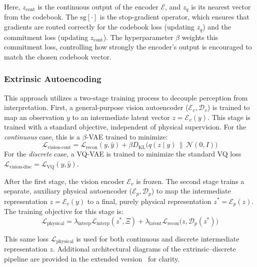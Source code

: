 \documentclass[nonacm,sigconf]{acmart}
\begin{document}
Here, \(z_{\text{cont}}\) is the continuous output of the encoder \(\mathcal{E}\), and \(z_q\) is its nearest vector from the codebook. The \(\text{sg}[\cdot]\) is the stop-gradient operator, which ensures that gradients are routed correctly for the codebook loss (updating \(z_q\)) and the commitment loss (updating \(z_{\text{cont}}\)). The hyperparameter \(\beta\) weights this commitment loss, controlling how strongly the encoder's output is encouraged to match the chosen codebook vector.


\subsubsection{Extrinsic Autoencoding}


This approach utilizes a two-stage training process to decouple perception from interpretation.
First, a general-purpose vision autoencoder (\(\mathcal{E}_v, \mathcal{D}_v\)) is trained to map an observation \(y\) to an intermediate latent vector \(z = \mathcal{E}_v(y)\). This stage is trained with a standard objective, independent of physical supervision.
For the \textit{continuous} case, this is a \(\beta\)-VAE trained to minimize:
\begin{equation}
    \mathcal{L}_{\text{vision-cont}} = \mathcal{L}_{\text{recon}}(y, \hat{y}) + \beta D_{\text{KL}}\big(q(z \mid y) \,\|\, \mathcal{N}(0, I)\big)
\end{equation}
For the \textit{discrete} case, a VQ-VAE is trained to minimize the standard VQ loss \(\mathcal{L}_{\text{vision-disc}} = \mathcal{L}_{\text{VQ}}(y, \hat{y})\).


After the first stage, the vision encoder \(\mathcal{E}_v\) is frozen. The second stage trains a separate, auxiliary {physical autoencoder} (\(\mathcal{E}_p, \mathcal{D}_p\)) to map the intermediate representation \(z = \mathcal{E}_v(y)\) to a final, purely physical representation \(z^* = \mathcal{E}_p(z)\). The training objective for this stage is:
\begin{equation}
    \mathcal{L}_{\text{physical}} = \lambda_{\text{interp}}\mathcal{L}_{\text{interp}}(z^*, \Xi) + \lambda_{\text{latent}}\mathcal{L}_{\text{recon}}\big(z,  \mathcal{D}_p(z^*))
\end{equation}

This same loss \(\mathcal{L}_{\text{physical}}\) is used for both continuous and discrete intermediate representation \(z\). Additional architectural diagrams of the 
extrinsic--discrete pipeline are provided in the extended version~\cite{extended} for clarity.
\end{document}
